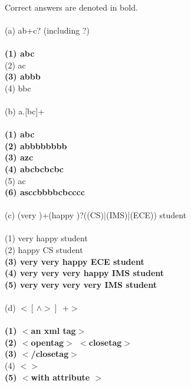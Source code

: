 \documentclass[a4paper]{article}
\newcommand{\solution}{\pagebreak[2]{\bf Solution:}\\}
\begin{document}
\solution
Correct answers are denoted in bold.\\
\\
(a) ab+c? (including ?)\\
\\
\textbf{(1) abc}\\
(2) ac\\
\textbf{(3) abbb}\\
(4) bbc\\
\\
(b) a.[bc]+\\
\\
\textbf{(1) abc}\\
\textbf{(2) abbbbbbbb}\\
\textbf{(3) azc}\\
\textbf{(4) abcbcbcbc}\\
(5) ac\\
\textbf{(6) asccbbbbcbcccc}\\
\\
(c) (very )+(happy )?((CS)|(IMS)|(ECE)) student\\
\\
(1) very happy student\\
(2) happy CS student\\
\textbf{(3) very very happy ECE student}\\
\textbf{(4) very very very happy IMS student}\\
\textbf{(5) very very very very IMS student}\\
\\
(d) $<[ \, \wedge > ] \, $ $+>$\\
\\
\textbf{(1) $<$an xml tag$>$}\\
\textbf{(2) $<$opentag$>$ $<$closetag$>$}\\
\textbf{(3) $<$/closetag$>$}\\
(4) $<>$\\
\textbf{(5) $<$with attribute $>$}
\end{document}
